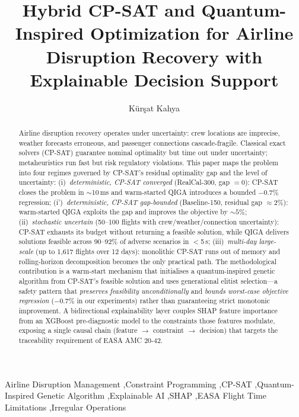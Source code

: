 \documentclass[12pt,number]{elsarticle}
\begin{document}
\begin{frontmatter}

\title{Hybrid CP-SAT and Quantum-Inspired Optimization for Airline Disruption Recovery with Explainable Decision Support}

\author[cska]{K\"ur\c{s}at Kahya}
\address[cska]{Department of Aviation and Space Sciences, \c{C}ukurova Science and Art Center, Adana, T\"urkiye}

\begin{abstract}
Airline disruption recovery operates under uncertainty: crew locations are imprecise, weather forecasts erroneous, and passenger connections cascade-fragile. Classical exact solvers (CP-SAT) guarantee nominal optimality but time out under uncertainty; metaheuristics run fast but risk regulatory violations. This paper maps the problem into four regimes governed by CP-SAT's residual optimality gap and the level of uncertainty: (i)~\emph{deterministic, CP-SAT converged} (RealCal-300, gap $=0$): CP-SAT closes the problem in $\sim$10\,ms and warm-started QIGA introduces a bounded $-0.7\%$ regression; (i')~\emph{deterministic, CP-SAT gap-bounded} (Baseline-150, residual gap $\approx 2\%$): warm-started QIGA exploits the gap and improves the objective by $\sim 5\%$; (ii)~\emph{stochastic uncertain} (50--100 flights with crew/weather/connection uncertainty): CP-SAT exhausts its budget without returning a feasible solution, while QIGA delivers solutions feasible across 90--92\% of adverse scenarios in $<$5\,s; (iii)~\emph{multi-day large-scale} (up to 1{,}617 flights over 12 days): monolithic CP-SAT runs out of memory and rolling-horizon decomposition becomes the only practical path. The methodological contribution is a warm-start mechanism that initialises a quantum-inspired genetic algorithm from CP-SAT's feasible solution and uses generational elitist selection---a safety pattern that \emph{preserves feasibility unconditionally} and \emph{bounds worst-case objective regression} ($-0.7\%$ in our experiments) rather than guaranteeing strict monotonic improvement. A bidirectional explainability layer couples SHAP feature importance from an XGBoost pre-diagnostic model to the constraints those features modulate, exposing a single causal chain (feature $\rightarrow$ constraint $\rightarrow$ decision) that targets the traceability requirement of EASA AMC 20-42.
\end{abstract}

\begin{keyword}
Airline Disruption Management \sep Constraint Programming \sep CP-SAT \sep Quantum-Inspired Genetic Algorithm \sep Explainable AI \sep SHAP \sep EASA Flight Time Limitations \sep Irregular Operations
\end{keyword}

\end{frontmatter}
\end{document}
